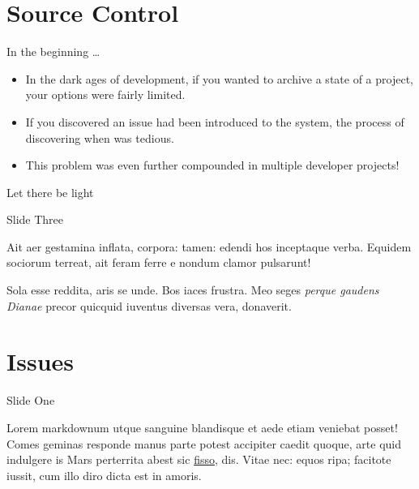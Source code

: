 \documentclass[ignorenonframetext,,aspectratio=169,14pt]{beamer}
\begin{document}
\section{Source Control}\label{source-control}

\begin{frame}{In the beginning \ldots{}}

\begin{itemize}
\itemsep1pt\parskip0pt
\item
  In the dark ages of development, if you wanted to archive a state of a
  project, your options were fairly limited.
\item
  If you discovered an issue had been introduced to the system, the
  process of discovering when was tedious.
\item
  This problem was even further compounded in multiple developer
  projects!
\end{itemize}

\end{frame}

\begin{frame}{Let there be light}

\end{frame}

\begin{frame}{Slide Three}

Ait aer gestamina inflata, corpora: tamen: edendi hos inceptaque verba.
Equidem sociorum terreat, ait feram ferre e nondum clamor pulsarunt!

Sola esse reddita, aris se unde. Bos iaces frustra. Meo seges
\emph{perque gaudens Dianae} precor quicquid iuventus diversas vera,
donaverit.

\end{frame}

\section{Issues}\label{issues}

\begin{frame}{Slide One}

Lorem markdownum utque sanguine blandisque et aede etiam veniebat
posset! Comes geminas responde manus parte potest accipiter caedit
quoque, arte quid indulgere is Mars perterrita abest sic
\href{http://zeus.ugent.be/}{fisso}, dis. Vitae nec: equos ripa;
facitote iussit, cum illo diro dicta est in amoris.

\end{frame}
\end{document}
